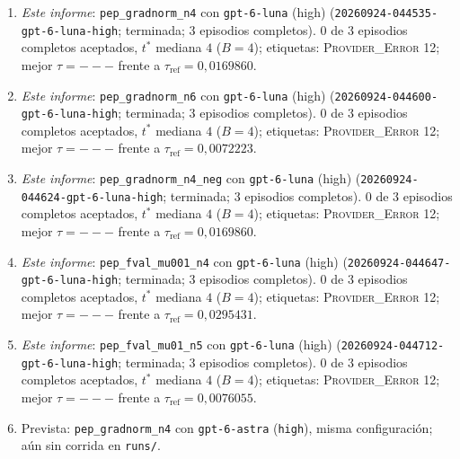\documentclass[11pt,a4paper]{article}
\begin{document}
\begin{enumerate}
  \item \emph{Este informe}: \texttt{pep\_\allowbreak{}gradnorm\_\allowbreak{}n4} con \texttt{gpt-\allowbreak{}6-\allowbreak{}luna} (high) (\texttt{20260924-\allowbreak{}044535-\allowbreak{}gpt-\allowbreak{}6-\allowbreak{}luna-\allowbreak{}high}; terminada; 3 episodios completos). 0 de 3 episodios completos aceptados, $t^*$ mediana $4$ ($B = 4$); etiquetas: \textsc{Provider\_Error} 12; mejor $\tau = ---$ frente a $\tau_{\mathrm{ref}} = 0{,}0169860$.
  \item \emph{Este informe}: \texttt{pep\_\allowbreak{}gradnorm\_\allowbreak{}n6} con \texttt{gpt-\allowbreak{}6-\allowbreak{}luna} (high) (\texttt{20260924-\allowbreak{}044600-\allowbreak{}gpt-\allowbreak{}6-\allowbreak{}luna-\allowbreak{}high}; terminada; 3 episodios completos). 0 de 3 episodios completos aceptados, $t^*$ mediana $4$ ($B = 4$); etiquetas: \textsc{Provider\_Error} 12; mejor $\tau = ---$ frente a $\tau_{\mathrm{ref}} = 0{,}0072223$.
  \item \emph{Este informe}: \texttt{pep\_\allowbreak{}gradnorm\_\allowbreak{}n4\_\allowbreak{}neg} con \texttt{gpt-\allowbreak{}6-\allowbreak{}luna} (high) (\texttt{20260924-\allowbreak{}044624-\allowbreak{}gpt-\allowbreak{}6-\allowbreak{}luna-\allowbreak{}high}; terminada; 3 episodios completos). 0 de 3 episodios completos aceptados, $t^*$ mediana $4$ ($B = 4$); etiquetas: \textsc{Provider\_Error} 12; mejor $\tau = ---$ frente a $\tau_{\mathrm{ref}} = 0{,}0169860$.
  \item \emph{Este informe}: \texttt{pep\_\allowbreak{}fval\_\allowbreak{}mu001\_\allowbreak{}n4} con \texttt{gpt-\allowbreak{}6-\allowbreak{}luna} (high) (\texttt{20260924-\allowbreak{}044647-\allowbreak{}gpt-\allowbreak{}6-\allowbreak{}luna-\allowbreak{}high}; terminada; 3 episodios completos). 0 de 3 episodios completos aceptados, $t^*$ mediana $4$ ($B = 4$); etiquetas: \textsc{Provider\_Error} 12; mejor $\tau = ---$ frente a $\tau_{\mathrm{ref}} = 0{,}0295431$.
  \item \emph{Este informe}: \texttt{pep\_\allowbreak{}fval\_\allowbreak{}mu01\_\allowbreak{}n5} con \texttt{gpt-\allowbreak{}6-\allowbreak{}luna} (high) (\texttt{20260924-\allowbreak{}044712-\allowbreak{}gpt-\allowbreak{}6-\allowbreak{}luna-\allowbreak{}high}; terminada; 3 episodios completos). 0 de 3 episodios completos aceptados, $t^*$ mediana $4$ ($B = 4$); etiquetas: \textsc{Provider\_Error} 12; mejor $\tau = ---$ frente a $\tau_{\mathrm{ref}} = 0{,}0076055$.
  \item Prevista: \texttt{pep\_\allowbreak{}gradnorm\_\allowbreak{}n4} con \texttt{gpt-\allowbreak{}6-\allowbreak{}astra} (\texttt{high}), misma configuración; aún sin corrida en \texttt{runs/}.

\end{enumerate}
\end{document}
